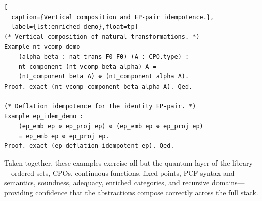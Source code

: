 \begin{lstlisting}[
  caption={Vertical composition and EP-pair idempotence.},
  label={lst:enriched-demo},float=tp]
(* Vertical composition of natural transformations. *)
Example nt_vcomp_demo
    (alpha beta : nat_trans F0 F0) (A : CPO.type) :
    nt_component (nt_vcomp beta alpha) A =
    (nt_component beta A) ⊚ (nt_component alpha A).
Proof. exact (nt_vcomp_component beta alpha A). Qed.

(* Deflation idempotence for the identity EP-pair. *)
Example ep_idem_demo :
    (ep_emb ep ⊚ ep_proj ep) ⊚ (ep_emb ep ⊚ ep_proj ep)
    = ep_emb ep ⊚ ep_proj ep.
Proof. exact (ep_deflation_idempotent ep). Qed.
\end{lstlisting}

\medskip
\noindent
Taken together, these examples exercise all but the quantum layer of the
library---ordered sets, CPOs, continuous functions, fixed points, PCF
syntax and semantics, soundness, adequacy, enriched categories, and
recursive domains---providing confidence that the abstractions compose
correctly across the full stack.
